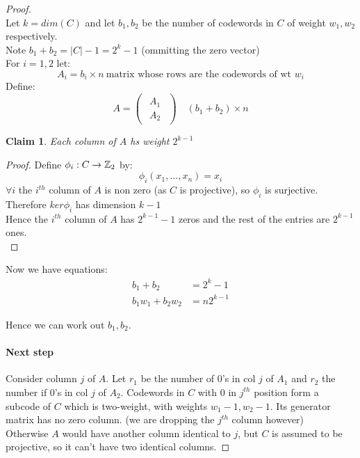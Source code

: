 \documentclass[]{article}
\newtheorem*{clm}{Claim}
\theoremstyle{definition}
\theoremstyle{remark}
\numberwithin{equation}{section}
\begin{document}
		\begin{proof}\hfill\\
			Let $k = dim(C)$ and let $b_1, b_2$ be the number of codewords in $C$ of weight $w_1, w_2$ respectively.\\
			Note $b_1 + b_2 = |C| - 1 = 2^k - 1$ (ommitting the zero vector)\\
			For $i = 1, 2$ let:
			\[
				A_i = b_i \times n\ \text{matrix whose rows are the codewords of wt $w_i$}
			\]
			Define:
			\[
				A = \begin{pmatrix}
					\begin{array}{cc}
					A_1\\ \hline
					A_2
					\end{array}
					\end{pmatrix} \quad (b_1 + b_2) \times n
			\]
			\begin{clm}
				Each column of $A$ hs weight $2^{k-1}$
			\end{clm}
			
			\begin{proof}
				Define $\phi_i : C \rightarrow \mathbb{Z}_2$ by:
				\[
					\phi_i(x_1,\hdots,x_n) = x_i				
				\]
				$\forall i$ the $i^{th}$ column of $A$ is non zero (as $C$ is projective), so $\phi_i$ is surjective. Therefore $ker\phi_i$ has dimension $k-1$\\
				Hence the $i^{th}$ column of $A$ has $2^{k-1} - 1$ zeros and the rest of the entries are $2^{k-1}$ ones.\\
			\end{proof}
			
			Now we have equations:
			\begin{align*}
				b_1 + b_2 &= 2^k-1\\
				b_1w_1 + b_2 w_2 &= n2^{k-1}
			\end{align*}

			Hence we can work out $b_1, b_2$.
			\paragraph*{Next step}
				Consider column $j$ of $A$. Let $r_1$ be the number of 0's in col $j$ of $A_1$ and $r_2$ the number if 0's in col $j$ of $A_2$. Codewords in $C$ with 0 in $j^{th}$ position form a subcode of $C$ which is two-weight, with weights $w_1 -1, w_2 -1$. Its generator matrix has no zero column. (we are dropping the $j^{th}$ column however) \\
				Otherwise $A$ would have another column identical to $j$, but $C$ is assumed to be projective, so it can't have two identical columns.


\end{proof}
\end{document}
